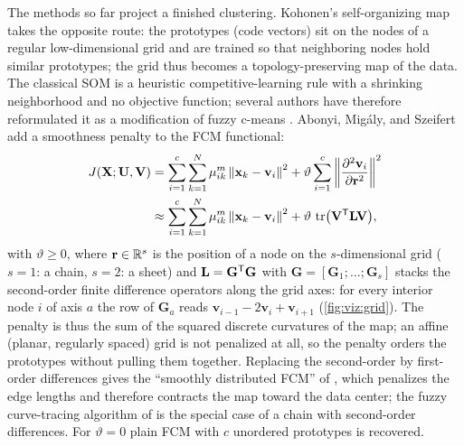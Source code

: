 The methods so far project a finished clustering. Kohonen's self-organizing map \cite{kohonen:1990} takes the opposite route: the prototypes (code vectors) sit on the nodes of a regular low-dimensional grid and are trained so that neighboring nodes hold similar prototypes; the grid thus becomes a topology-preserving map of the data. The classical SOM is a heuristic competitive-learning rule with a shrinking neighborhood and no objective function; several authors have therefore reformulated it as a modification of fuzzy c-means \cite{tsao:1994:fkcn,pascualmarqui:2001}. Abonyi, Migály, and Szeifert \cite{migaly:2003:fsom} add a smoothness penalty to the FCM functional:
\begin{align}
  J(\mathbf{X};\mathbf{U},\mathbf{V}) &= \sum_{i=1}^{c}\sum_{k=1}^{N}\mu_{ik}^m\left\lVert \mathbf{x}_k-\mathbf{v}_i \right\rVert^2 + \vartheta\sum_{i=1}^{c}\left\lVert \frac{\partial^2\mathbf{v}_i}{\partial\mathbf{r}^2} \right\rVert^2\notag\\
  &\approx \sum_{i=1}^{c}\sum_{k=1}^{N}\mu_{ik}^m\left\lVert \mathbf{x}_k-\mathbf{v}_i \right\rVert^2 + \vartheta\,\operatorname{tr}\bigl(\mathbf{V}^{\mathsf{T}}\mathbf{L}\mathbf{V}\bigr),
  \label{eq:viz:fsomJ}
\end{align}
with $\vartheta\ge0$, where $\mathbf{r}\in\mathbb{R}^s$ is the position of a node on the $s$-dimensional grid ($s=1$: a chain, $s=2$: a sheet) and $\mathbf{L}=\mathbf{G}^{\mathsf{T}}\mathbf{G}$ with $\mathbf{G}=[\mathbf{G}_1;\dots;\mathbf{G}_s]$ stacks the second-order finite difference operators along the grid axes: for every interior node $i$ of axis $a$ the row of $\mathbf{G}_a$ reads $\mathbf{v}_{i-1}-2\mathbf{v}_i+\mathbf{v}_{i+1}$ (\cref{fig:viz:grid}). The penalty is thus the sum of the squared discrete curvatures of the map; an affine (planar, regularly spaced) grid is not penalized at all, so the penalty orders the prototypes without pulling them together. Replacing the second-order by first-order differences gives the ``smoothly distributed FCM'' of \cite{pascualmarqui:2001}, which penalizes the edge lengths and therefore contracts the map toward the data center; the fuzzy curve-tracing algorithm of \cite{yan:2001:curvetrace} is the special case of a chain with second-order differences. For $\vartheta=0$ plain FCM with $c$ unordered prototypes is recovered.

